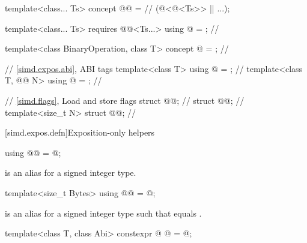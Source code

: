 \begin{codeblock}
template<class... Ts>
  concept @@ =                                      // \expos
    (@<@<Ts>> || ...);

template<class... Ts>
  requires @@<Ts...>
    using @ = \seebelownc@;                            // \expos

template<class BinaryOperation, class T>
  concept @ = \seebelownc@;                    // \expos

// \ref{simd.expos.abi},  ABI tags
template<class T> using @ = \seebelownc@;                      // \expos
template<class T, @@ N> using @ = \seebelownc@;  // \expos

// \ref{simd.flags}, Load and store flags
struct @@;                                                 // \expos
struct @@;                                                 // \expos
template<size_t N> struct @@;                          // \expos
\end{codeblock}

[simd.expos.defn]{Exposition-only helpers}

\begin{itemdecl}
using @@ = @\seebelow@;
\end{itemdecl}

\begin{itemdescr}
\pnum
{} is an alias for a signed integer type.
\end{itemdescr}

\begin{itemdecl}
template<size_t Bytes> using @@ = @\seebelow@;
\end{itemdecl}

\begin{itemdescr}
\pnum
{} is an alias for a signed integer type
 such that  equals .
\end{itemdescr}

\begin{itemdecl}
template<class T, class Abi>
  constexpr @ @ = @\seebelow@;
\end{itemdecl}

